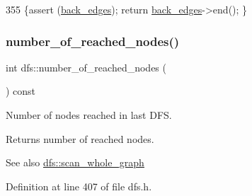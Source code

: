 \begin{DoxyCode}
355     \{assert (\mbox{\hyperlink{classdfs_a1dc18a7df8d6b238d5301c92fc7540fa}{back\_edges}}); \textcolor{keywordflow}{return} \mbox{\hyperlink{classdfs_a1dc18a7df8d6b238d5301c92fc7540fa}{back\_edges}}->end(); \}
\end{DoxyCode}
\mbox{\label{classdfs_ae8849a552721ad4af5d9a81c6da35822}} 
\subsubsection{\texorpdfstring{number\+\_\+of\+\_\+reached\+\_\+nodes()}{number\_of\_reached\_nodes()}}
{\footnotesize\ttfamily int dfs\+::number\+\_\+of\+\_\+reached\+\_\+nodes (\begin{DoxyParamCaption}{ }\end{DoxyParamCaption}) const\hspace{0.3cm}{\ttfamily [inline]}}



Number of nodes reached in last D\+FS. 

\begin{DoxyReturn}{Returns}
number of reached nodes. 
\end{DoxyReturn}
\begin{DoxySeeAlso}{See also}
\mbox{\hyperlink{classdfs_aa7c864a6f3a120720138b187b3ed95b5}{dfs\+::scan\+\_\+whole\+\_\+graph}} 
\end{DoxySeeAlso}


Definition at line 407 of file dfs.\+h.


